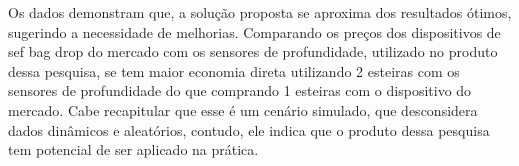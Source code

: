     Os dados demonstram que, a solução proposta se aproxima dos resultados ótimos, sugerindo a necessidade de melhorias. Comparando os preços dos dispositivos de sef bag drop do mercado com os sensores de profundidade, utilizado no produto dessa pesquisa, se tem maior economia direta utilizando 2 esteiras com os sensores de profundidade do que comprando 1 esteiras com o dispositivo do mercado. Cabe recapitular que esse é um cenário simulado, que desconsidera dados dinâmicos e aleatórios, contudo, ele indica que o produto dessa pesquisa tem potencial de ser aplicado na prática. 

